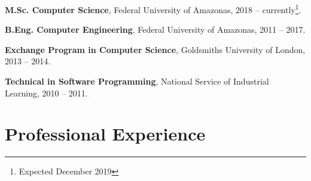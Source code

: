 \documentclass[letterpaper]{article}
\renewenvironment{itemize}{
  \begin{list}{}{
    \setlength{\leftmargin}{1.5em}
  }
}{
  \end{list}
}
\begin{document}
\begin{itemize}
  \item {\bf M.Sc. Computer Science}, Federal University of Amazonas, 2018 -- currently\footnote{Expected December 2019}.
  
  \item {\bf B.Eng. Computer Engineering}, Federal University of Amazonas, 2011 -- 2017.

  \item {\bf Exchange Program in Computer Science}, Goldsmiths University of London, 2013 -- 2014.

  \item {\bf Technical in Software Programming}, National Service of Industrial Learning, 2010 -- 2011.
\end{itemize}


\section*{Professional Experience}
\end{document}
